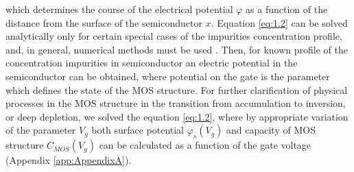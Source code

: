 \iffalse
ktorá určuje priebeh elektrického potenciálu $\varphi$ ako funkciu
vzdialenosti od povrchu polovodiča $x$. Rovnicu \ref{eq:1.2} možno
analyticky vyriešiť len pre určité špeciálne prípady priebehu
koncentrácie prímesí a vo všeobecnosti treba použiť numerické metódy
\cite{1.9,1.10}. Potom pre známy priebeh koncentrácie prímesí v
polovodiči možno získať priebeh elektrického potenciálu v polovodiči,
pričom napätie hradla považujeme za parameter, určujúci stav
štruktúry. Pre bližšie ozrejmenie fyzikálnych procesov v štruktúre MOS
pri prechode zo stavu akumulácie do inverzie, alebo hlbokého
ochudobnenia sme riešili rovnicu \ref{eq:1.2}, kde pri vhodnej
variácii parametra $V_g$ možno zároveň získať priebeh povrchového
potenciálu ako funkciu napätia hradla $\varphi_{s}(V_g)$ a závislosť
kapacity štruktúry MOS $C_{mos}(V_g)$ (Dodatok \ref{app:AppendixA}).
\fi
which determines the course of the electrical potential $\varphi$ as a
function of the distance from the surface of the semiconductor
$x$. Equation \ref{eq:1.2} can be solved analytically only for certain
special cases of the impurities concentration profile, and, in
general, numerical methods must be used \cite{1.9,1.10}. Then, for
known profile of the concentration impurities in semiconductor an
electric potential in the semiconductor can be obtained, where
potential on the gate is the parameter which defines the state of the
MOS structure. For further clarification of physical processes in the
MOS structure in the transition from accumulation to inversion, or
deep depletion, we solved the equation \ref{eq:1.2}, where by
appropriate variation of the parameter $V_g$ both surface potential
$\varphi_{s}(V_g)$ and capacity of MOS structure $C_{MOS}(V_g)$ can
be calculated as a function of the gate voltage (Appendix
\ref{app:AppendixA}).

